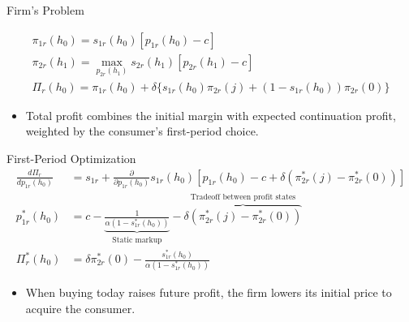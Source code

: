 \documentclass[aspectratio=169,professionalfonts]{beamer}
\newcommand{\shortbuttons}{}
\begin{document}
\gdef\shortbuttons{}
\begin{frame}[label=short-8]{Firm's Problem}
  \begingroup
  \setlength{\jot}{7pt}

    \begin{gather*}
      \pi_{1r}(h_0) = s_{1r}(h_0)[p_{1r}(h_0) - c] \\
      \pi_{2r}(h_1) = \max_{p_{2r}(h_1)} s_{2r}(h_1)[p_{2r}(h_1) - c] \\
      \Pi_r(h_0) = \pi_{1r}(h_0) + \delta\{s_{1r}(h_0)\pi_{2r}(j) + (1-s_{1r}(h_0))\pi_{2r}(0)\}
    \end{gather*}
  \endgroup
  \begin{itemize}
    \item Total profit combines the initial margin with expected continuation profit,
      weighted by the consumer's first-period choice.
  \end{itemize}
\end{frame}


\gdef\shortbuttons{\hyperlink{short-9}{\beamergotobutton{Terminal FOC}}\hspace{.35em}\hyperlink{short-11}{\beamergotobutton{Comparative statics}}\hspace{.35em}\hyperlink{short-52}{\beamergotobutton{Elasticities}}}
\begin{frame}[label=short-10]{First-Period Optimization}
  \begin{align*}
    \frac{d\Pi_r}{d p_{1r}(h_0)} &= s_{1r} + \frac{\partial}{\partial p_{1r}(h_0)}s_{1r}(h_0)[p_{1r}(h_0) - c + \delta(\pi_{2r}^*(j) - \pi_{2r}^*(0))] \\
    p_{1r}^*(h_0) &= c - \underbrace{\frac{1}{\alpha(1-s_{1r}^*(h_0))}}_{\text{Static markup}} - \overbrace{\delta(\pi_{2r}^*(j) - \pi_{2r}^*(0))}^{\text{Tradeoff between profit states}} \\
    \Pi_r^*(h_0) &= \delta\pi_{2r}^*(0) - \frac{s_{1r}^*(h_0)}{\alpha(1-s_{1r}^*(h_0))}
  \end{align*}
  \begin{itemize}
    \item When buying today raises future profit, the firm lowers its initial price to acquire the consumer.
  \end{itemize}
\end{frame}
\end{document}

